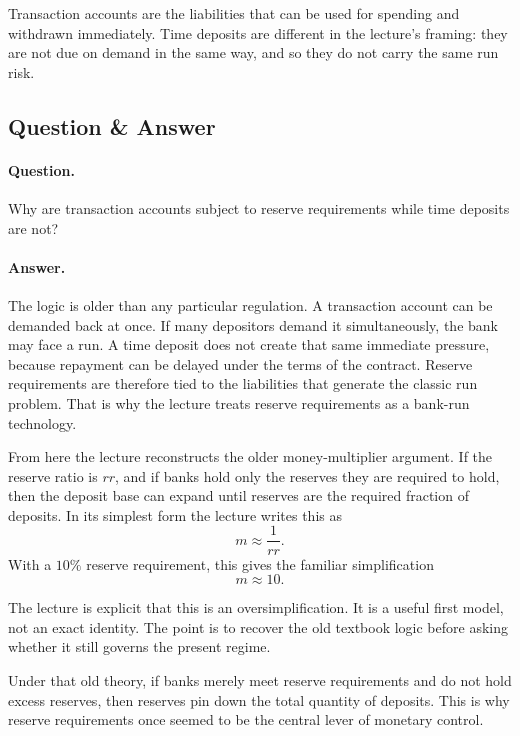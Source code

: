 Transaction accounts are the liabilities that can be used for spending and withdrawn immediately. Time deposits are different in the lecture's framing: they are not due on demand in the same way, and so they do not carry the same run risk.

\subsection{Question \& Answer}

\paragraph{Question.} Why are transaction accounts subject to reserve requirements while time deposits are not?

\paragraph{Answer.} The logic is older than any particular regulation. A transaction account can be demanded back at once. If many depositors demand it simultaneously, the bank may face a run. A time deposit does not create that same immediate pressure, because repayment can be delayed under the terms of the contract. Reserve requirements are therefore tied to the liabilities that generate the classic run problem. That is why the lecture treats reserve requirements as a bank-run technology.

From here the lecture reconstructs the older money-multiplier argument. If the reserve ratio is \(rr\), and if banks hold only the reserves they are required to hold, then the deposit base can expand until reserves are the required fraction of deposits. In its simplest form the lecture writes this as
\begin{equation}
m \approx \frac{1}{rr}.
\end{equation}
With a \(10\%\) reserve requirement, this gives the familiar simplification
\begin{equation}
m \approx 10.
\end{equation}

\begin{remark}
The lecture is explicit that this is an oversimplification. It is a useful first model, not an exact identity. The point is to recover the old textbook logic before asking whether it still governs the present regime.
\end{remark}

Under that old theory, if banks merely meet reserve requirements and do not hold excess reserves, then reserves pin down the total quantity of deposits. This is why reserve requirements once seemed to be the central lever of monetary control.

